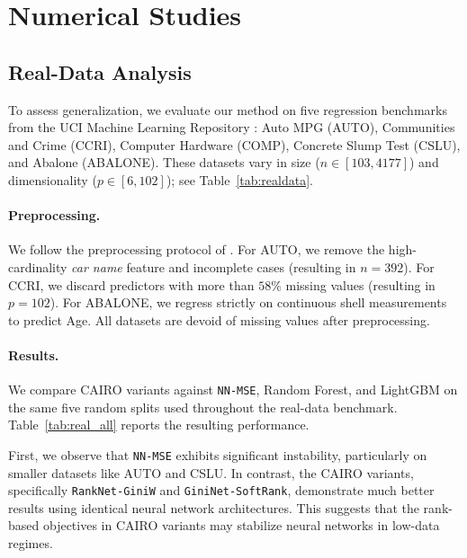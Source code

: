 \documentclass[11pt]{article}
\theoremstyle{plain}
\theoremstyle{plain}
\theoremstyle{plain}
\theoremstyle{plain}
\theoremstyle{plain}
\theoremstyle{plain}
\theoremstyle{plain}
\newenvironment{addedblock}{\begingroup\color{cairoaddedgreen}}{\endgroup}
\begin{document}
 


\section{Numerical Studies}
\label{sec:experiments}

\begin{addedblock}

\end{addedblock}

\subsection{Real-Data Analysis}
\label{subsec:realdata_setup}

To assess generalization, we evaluate our method on five regression benchmarks from the UCI Machine Learning Repository \citep{frank2010uci}: Auto MPG (AUTO), Communities and Crime (CCRI), Computer Hardware (COMP), Concrete Slump Test (CSLU), and Abalone (ABALONE). These datasets vary in size ($n \in [103, 4177]$) and dimensionality ($p \in [6, 102]$); see Table~\ref{tab:realdata}.

\paragraph{Preprocessing.}
We follow the preprocessing protocol of \citet{roy2012robustness}. For AUTO, we remove the high-cardinality \emph{car name} feature and incomplete cases (resulting in $n=392$). For CCRI, we discard predictors with more than $58\%$ missing values (resulting in $p=102$). For ABALONE, we regress strictly on continuous shell measurements to predict Age.  All datasets are devoid of missing values after preprocessing.

\begin{addedblock}
\paragraph{Results.}
We compare \textsc{CAIRO} variants against \texttt{NN-MSE}, Random Forest, and LightGBM on the same five random splits used throughout the real-data benchmark. Table~\ref{tab:real_all} reports the resulting performance.
\end{addedblock}

First, we observe that \texttt{NN-MSE} exhibits significant instability, particularly on smaller datasets like AUTO and CSLU. In contrast, the \textsc{CAIRO} variants, specifically \texttt{RankNet-GiniW} and \texttt{GiniNet-SoftRank}, demonstrate much better results using identical neural network architectures. This suggests that the rank-based objectives in CAIRO variants may stabilize neural networks in low-data regimes.
\end{document}

